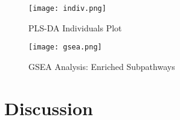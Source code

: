 \documentclass{article}
\begin{document}


\begin{figure}
  \caption{PLS-DA Individuals Plot}
  \texttt{[image: indiv.png]}
  \centering
  \label{fig:indiv}
  \end{figure}

\begin{figure}
  \caption{GSEA Analysis: Enriched Subpathways}
  \texttt{[image: gsea.png]}
  \centering
  \label{fig:gsea}
  \end{figure}


\section*{Discussion}




\end{document}
